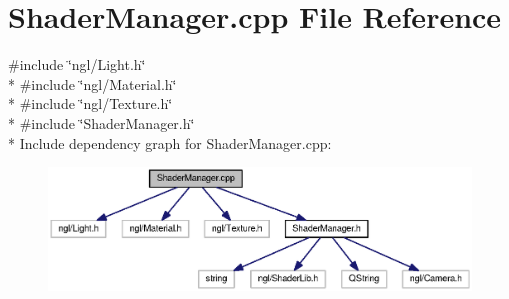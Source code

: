 \section{Shader\-Manager.\-cpp File Reference}
\label{_shader_manager_8cpp}
{\ttfamily \#include \char`\"{}ngl/\-Light.\-h\char`\"{}}\\*
{\ttfamily \#include \char`\"{}ngl/\-Material.\-h\char`\"{}}\\*
{\ttfamily \#include \char`\"{}ngl/\-Texture.\-h\char`\"{}}\\*
{\ttfamily \#include \char`\"{}Shader\-Manager.\-h\char`\"{}}\\*
Include dependency graph for Shader\-Manager.\-cpp\-:\nopagebreak
\begin{figure}[H]
\begin{center}
\leavevmode
\includegraphics[width=350pt]{_shader_manager_8cpp__incl}
\end{center}
\end{figure}
